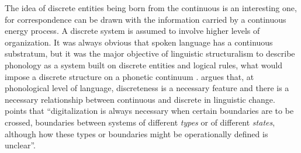 The idea of discrete entities being born from the continuous is an interesting one,
for correspondence can be drawn with the information carried by a continuous energy process.
A discrete system is assumed to involve higher levels of organization.
It was always obvious that spoken language has a continuous substratum, but
it was the major objective of linguistic structuralism to describe phonology
as a system built on discrete entities and logical rules, what would impose
a discrete structure on a phonetic continuum \citep{chomsky1957}. 
\cite{mandelbrot1954} argues that, at phonological level of language, discreteness is a necessary feature
and there is a necessary relationship between continuous and discrete in linguistic change.
\cite{wilden2001} points that ``digitalization is always necessary when certain boundaries are to be crossed,
boundaries between systems of different \textit{types} or of different \textit{states},
although how these types or boundaries might be operationally defined is unclear''. 




